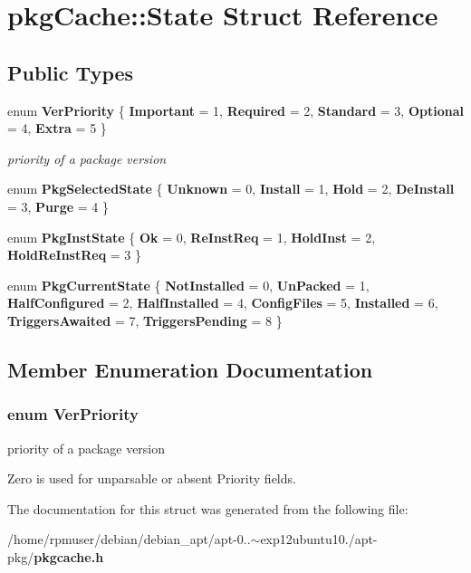 \section{pkg\-Cache\-:\-:\-State \-Struct \-Reference}
\label{structpkgCache_1_1State}
\subsection*{\-Public \-Types}
\begin{DoxyCompactItemize}
\item 
enum {\bf \-Ver\-Priority} \{ \*
{\bfseries \-Important} = 1, 
{\bfseries \-Required} = 2, 
{\bfseries \-Standard} = 3, 
{\bfseries \-Optional} = 4, 
\*
{\bfseries \-Extra} = 5
 \}
\begin{DoxyCompactList}\small\item\em priority of a package version \end{DoxyCompactList}\item 
enum {\bfseries \-Pkg\-Selected\-State} \{ \*
{\bfseries \-Unknown} = 0, 
{\bfseries \-Install} = 1, 
{\bfseries \-Hold} = 2, 
{\bfseries \-De\-Install} = 3, 
\*
{\bfseries \-Purge} = 4
 \}
\item 
enum {\bfseries \-Pkg\-Inst\-State} \{ {\bfseries \-Ok} = 0, 
{\bfseries \-Re\-Inst\-Req} = 1, 
{\bfseries \-Hold\-Inst} = 2, 
{\bfseries \-Hold\-Re\-Inst\-Req} = 3
 \}
\item 
enum {\bfseries \-Pkg\-Current\-State} \{ \*
{\bfseries \-Not\-Installed} = 0, 
{\bfseries \-Un\-Packed} = 1, 
{\bfseries \-Half\-Configured} = 2, 
{\bfseries \-Half\-Installed} = 4, 
\*
{\bfseries \-Config\-Files} = 5, 
{\bfseries \-Installed} = 6, 
{\bfseries \-Triggers\-Awaited} = 7, 
{\bfseries \-Triggers\-Pending} = 8
 \}
\end{DoxyCompactItemize}


\subsection{\-Member \-Enumeration \-Documentation}
\subsubsection[{\-Ver\-Priority}]{\setlength{\rightskip}{0pt plus 5cm}enum {\bf \-Ver\-Priority}}\label{structpkgCache_1_1State_a2583b563902f3753ad4de31828b03773}


priority of a package version 

\-Zero is used for unparsable or absent \-Priority fields. 

\-The documentation for this struct was generated from the following file\-:\begin{DoxyCompactItemize}
\item 
/home/rpmuser/debian/debian\-\_\-apt/apt-\/0..$\sim$exp12ubuntu10./apt-\/pkg/{\bf pkgcache.\-h}\end{DoxyCompactItemize}
